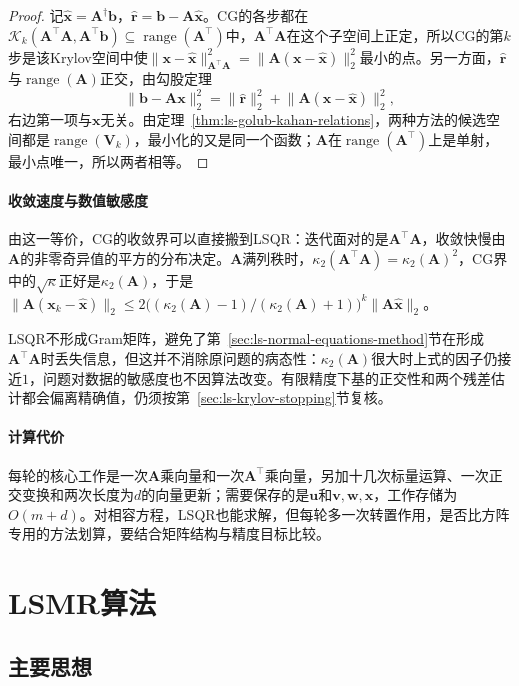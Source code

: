 \begin{proof}
记$\hat{\bm x}=\bm A^\dagger\bm b$，$\hat{\bm r}=\bm b-\bm A\hat{\bm x}$。CG的各步都在$\mathcal K_k(\bm A^\top\bm A,\bm A^\top\bm b)\subseteq\operatorname{range}(\bm A^\top)$中，$\bm A^\top\bm A$在这个子空间上正定，所以CG的第$k$步是该Krylov空间中使$\lVert\bm x-\hat{\bm x}\rVert_{\bm A^\top\bm A}^2=\lVert\bm A(\bm x-\hat{\bm x})\rVert_2^2$最小的点。另一方面，$\hat{\bm r}$与$\operatorname{range}(\bm A)$正交，由勾股定理
\[
 \lVert\bm b-\bm A\bm x\rVert_2^2=\lVert\hat{\bm r}\rVert_2^2+\lVert\bm A(\bm x-\hat{\bm x})\rVert_2^2 ,
\]
右边第一项与$\bm x$无关。由定理~\ref{thm:ls-golub-kahan-relations}，两种方法的候选空间都是$\operatorname{range}(\bm V_k)$，最小化的又是同一个函数；$\bm A$在$\operatorname{range}(\bm A^\top)$上是单射，最小点唯一，所以两者相等。
\end{proof}

\paragraph{收敛速度与数值敏感度}
由这一等价，CG的收敛界可以直接搬到LSQR：迭代面对的是$\bm A^\top\bm A$，收敛快慢由$\bm A$的非零奇异值的平方的分布决定。$\bm A$满列秩时，$\kappa_2(\bm A^\top\bm A)=\kappa_2(\bm A)^2$，CG界中的$\sqrt{\kappa}$正好是$\kappa_2(\bm A)$，于是$\lVert\bm A(\bm x_k-\hat{\bm x})\rVert_2\le2\bigl((\kappa_2(\bm A)-1)/(\kappa_2(\bm A)+1)\bigr)^k\lVert\bm A\hat{\bm x}\rVert_2$。

LSQR不形成Gram矩阵，避免了第~\ref{sec:ls-normal-equations-method}节在形成$\bm A^\top\bm A$时丢失信息，但这并不消除原问题的病态性：$\kappa_2(\bm A)$很大时上式的因子仍接近$1$，问题对数据的敏感度也不因算法改变。有限精度下基的正交性和两个残差估计都会偏离精确值，仍须按第~\ref{sec:ls-krylov-stopping}节复核。

\paragraph{计算代价}
每轮的核心工作是一次$\bm A$乘向量和一次$\bm A^\top$乘向量，另加十几次标量运算、一次正交变换和两次长度为$d$的向量更新；需要保存的是$\bm u$和$\bm v,\bm w,\bm x$，工作存储为$O(m+d)$。对相容方程，LSQR也能求解，但每轮多一次转置作用，是否比方阵专用的方法划算，要结合矩阵结构与精度目标比较。

\section{LSMR算法}
\label{sec:ls-lsmr}

\subsection{主要思想}

